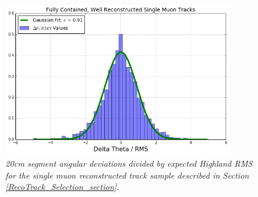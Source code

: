 \begin{figure}[h!]
\begin{center}
\includegraphics[width=100mm]{Figures/Highland_validation_RecoTracks.png}
\end{center}
\caption{\textit{20cm segment angular deviations divided by expected Highland RMS for the single muon reconstructed track sample described in Section \ref{RecoTrack_Selection_section}.}}
\label{Highland_validation_RecoTracks_fig}
\end{figure}



















